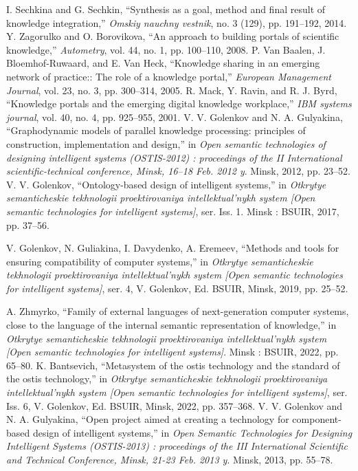 \documentclass[a4paper]{article}
\begin{document}
\begin{multicols}{2}
\begin{center}
\begin{thebibliography}{46}
     I. Sechkina and G. Sechkin, “Synthesis as a goal, method and
    final result of knowledge integration,” \textit{Omskiy nauchny vestnik},
no. 3 (129), pp. 191–192, 2014.
    Y. Zagorulko and O. Borovikova, “An approach to building portals
of scientific knowledge,” \textit{Autometry}, vol. 44, no. 1, pp. 100–110,
2008.
    P. Van Baalen, J. Bloemhof-Ruwaard, and E. Van Heck, “Knowledge sharing in an emerging network of practice:: The role of a
knowledge portal,” \textit{European Management Journal}, vol. 23, no. 3,
pp. 300–314, 2005.
     R. Mack, Y. Ravin, and R. J. Byrd, “Knowledge portals and
the emerging digital knowledge workplace,” \textit{IBM systems journal},
vol. 40, no. 4, pp. 925–955, 2001.
     V. V. Golenkov and N. A. Gulyakina, “Graphodynamic models
of parallel knowledge processing: principles of construction,
implementation and design,” in \textit{Open semantic technologies of
designing intelligent systems (OSTIS-2012) : proceedings of the
II International scientific-technical conference, Minsk, 16–18 Feb.
2012 y}. Minsk, 2012, pp. 23–52.
    V. V. Golenkov, “Ontology-based design of intelligent systems,”
in \textit{Otkrytye semanticheskie tekhnologii proektirovaniya intellektual’nykh system [Open semantic technologies for intelligent
systems]}, ser. Iss. 1. Minsk : BSUIR, 2017, pp. 37–56.

    V. Golenkov, N. Guliakina, I. Davydenko, A. Eremeev, “Methods and tools for ensuring compatibility of computer systems,”
in \textit{Otkrytye semanticheskie tekhnologii proektirovaniya intellektual’nykh system [Open semantic technologies for intelligent
systems]}, ser. 4, V. Golenkov, Ed. BSUIR, Minsk, 2019, pp.
25–52.

    A. Zhmyrko, “Family of external languages of next-generation
computer systems, close to the language of the internal semantic representation of knowledge,” in \textit{Otkrytye semanticheskie
tekhnologii proektirovaniya intellektual’nykh system [Open semantic technologies for intelligent systems]}. Minsk : BSUIR,
2022, pp. 65–80.
    K. Bantsevich, “Metasystem of the ostis technology and
the standard of the ostis technology,” in \textit{Otkrytye semanticheskie tekhnologii proektirovaniya intellektual’nykh system
[Open semantic technologies for intelligent systems]}, ser. Iss. 6,
V. Golenkov, Ed. BSUIR, Minsk, 2022, pp. 357–368.
    V. V. Golenkov and N. A. Gulyakina, “Open project aimed
at creating a technology for component-based design of
intelligent systems,” in \textit{Open Semantic Technologies for Designing
Intelligent Systems (OSTIS-2013) : proceedings of the III
International Scientific and Technical Conference, Minsk, 21-23
Feb. 2013 y}. Minsk, 2013, pp. 55–78.


\end{thebibliography}
\end{center}
\end{multicols}
\end{document}
